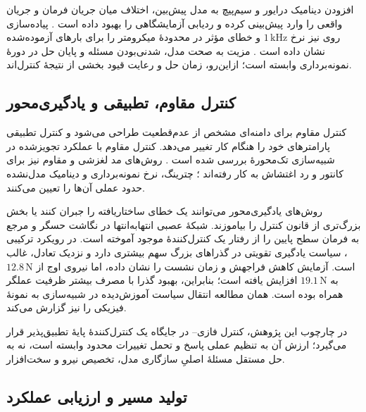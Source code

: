 افزودن دینامیک درایور و سیم‌پیچ به مدل پیش‌بین، اختلاف میان جریان فرمان و جریان واقعی را وارد پیش‌بینی کرده و ردیابی آزمایشگاهی را بهبود داده است \cite{ranDriveaugmentedModelPredictive2025}. پیاده‌سازی روی  نیز نرخ \(1\,\mathrm{kHz}\) و خطای مؤثر در محدودهٔ میکرومتر را برای بارهای آزموده‌شده نشان داده است \cite{zhouTrackingErrorSuppression2025}. مزیت  به صحت مدل، شدنی‌بودن مسئله و پایان حل در دورهٔ نمونه‌برداری وابسته است؛ ازاین‌رو، زمان حل و رعایت قیود بخشی از نتیجهٔ کنترل‌اند.

\subsection{کنترل مقاوم، تطبیقی و یادگیری‌محور}
\label{subsec:robust-adaptive-learning-control}

کنترل مقاوم برای دامنه‌ای مشخص از عدم‌قطعیت طراحی می‌شود و کنترل تطبیقی پارامترهای خود را هنگام کار تغییر می‌دهد. کنترل  مقاوم با عملکرد تجویزشده در شبیه‌سازی تک‌محورهٔ  بررسی شده است \cite{chenRobustPIControl2024}. روش‌های مد لغزشی و مقاوم نیز برای کانتور و رد اغتشاش به کار رفته‌اند \cite{j.liHighPrecisionTriaxialContouring2026,duDoubleEventTriggeredGlobal2026}؛ چترینگ، نرخ نمونه‌برداری و دینامیک مدل‌نشده حدود عملی آن‌ها را تعیین می‌کنند.

روش‌های یادگیری‌محور می‌توانند یک خطای ساختاریافته را جبران کنند یا بخش بزرگ‌تری از قانون کنترل را بیاموزند. شبکهٔ عصبی انتهابه‌انتها در \cite{hartmannEndtoEndLowLevelNeural2025} نگاشت حسگر و مرجع به فرمان سطح پایین را از رفتار یک کنترل‌کنندهٔ موجود آموخته است. در رویکرد ترکیبی \cite{wangRealTimeDeepReinforcement2026d}، سیاست یادگیری تقویتی در گذراهای بزرگ سهم بیشتری دارد و نزدیک تعادل،  غالب است. آزمایش کاهش فراجهش و زمان نشست را نشان داده، اما نیروی اوج از \(12.8\,\mathrm{N}\) به \(19.1\,\mathrm{N}\) افزایش یافته است؛ بنابراین، بهبود گذرا با مصرف بیشتر ظرفیت عملگر همراه بوده است. همان مطالعه انتقال سیاست آموزش‌دیده در شبیه‌سازی به نمونهٔ فیزیکی را نیز گزارش می‌کند.

در چارچوب این پژوهش، کنترل فازی-- در جایگاه یک کنترل‌کنندهٔ پایهٔ تطبیق‌پذیر قرار می‌گیرد؛ ارزش آن به تنظیم عملی پاسخ و تحمل تغییرات محدود وابسته است، نه به حل مستقل مسئلهٔ اصلیِ سازگاری مدل، تخصیص نیرو و سخت‌افزار.

\subsection{تولید مسیر و ارزیابی عملکرد}
\label{subsec:trajectory-performance-evaluation}

